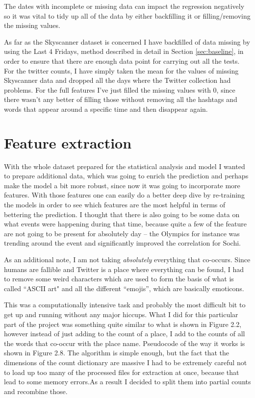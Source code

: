 \documentclass[minf,twoside,singlespacing,parskip,frontabs,notimes,11pt]{infthesis}
\begin{document}
The dates with incomplete or missing data can impact the regression negatively so it was vital to tidy up all of the data by either backfilling it or filling/removing the missing values. 

As far as the Skyscanner dataset is concerned I have backfilled of data missing by using the Last 4 Fridays, method described in detail in Section \ref{sec:baseline}, in order to ensure that there are enough data point for carrying out all the tests. For the twitter counts, I have simply taken the mean for the values of missing Skyscanner data and dropped all the days where the Twitter collection had problems. For the full features I've just filled the missing values with 0, since there wasn't any better of filling those without removing all the hashtags and words that appear around a specific time and then disappear again.


\section{Feature extraction}
\label{feat-extraction}

With the whole dataset prepared for the statistical analysis and model I wanted to prepare additional data, which was going to enrich the prediction and perhaps make the model a bit more robust, since now it was going to incorporate  more features. With those features one can easily do a better deep dive by re-training the models in order to see which features are the most  helpful in terms of bettering the prediction. I thought that there is also going to be some data on what events were happening during that time, because quite a few of the feature are not going to be present for absolutely day -- the Olympics for instance was trending around the event and significantly improved the correlation for Sochi. 


As an additional note, I am not taking \textit{absolutely} everything that co-occurs. Since humans are fallible and Twitter is a place where everything can be found, I had to remove some weird characters which are used to form the basis of what is called ``ASCII art" and all the different ``emojis'', which are basically emoticons.


This was a computationally intensive task and probably the most difficult bit to get up and running without any major hiccups. What I did for this particular part of the project was something quite similar to what is shown in Figure 2.2, however instead of just adding to the count of a place, I add to the counts of all the words that co-occur with the place name.  Pseudocode of the way it works is shown in Figure 2.8. The algorithm is simple enough, but the fact that the dimensions of the count dictionary are massive I had to be extremely careful not to load up too many of the processed files for extraction at once, because that lead to some memory errors.As a result I decided to split them into partial counts and recombine those. 
\end{document}
